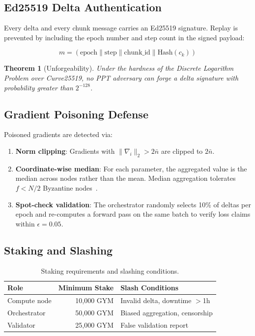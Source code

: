 \documentclass[11pt,letterpaper]{article}
\newtheorem{theorem}{Theorem}[section]
\begin{document}
\subsection{Ed25519 Delta Authentication}

Every delta and every chunk message carries an Ed25519 signature.  Replay is prevented by including the epoch number and step count in the signed payload:

\begin{equation}
    m = (\text{epoch} \| \text{step} \| \text{chunk\_id} \| \text{Hash}(c_k))
\end{equation}

\begin{theorem}[Unforgeability]
Under the hardness of the Discrete Logarithm Problem over Curve25519, no PPT adversary can forge a delta signature with probability greater than $2^{-128}$.
\end{theorem}

\subsection{Gradient Poisoning Defense}

Poisoned gradients are detected via:

\begin{enumerate}
    \item \textbf{Norm clipping}: Gradients with $\|\nabla_i\|_2 > 2\bar{n}$ are clipped to $2\bar{n}$.
    \item \textbf{Coordinate-wise median}: For each parameter, the aggregated value is the median across nodes rather than the mean.  Median aggregation tolerates $f < N/2$ Byzantine nodes~\cite{yin2018byzantine}.
    \item \textbf{Spot-check validation}: The orchestrator randomly selects 10\% of deltas per epoch and re-computes a forward pass on the same batch to verify loss claims within $\epsilon = 0.05$.
\end{enumerate}

\subsection{Staking and Slashing}

\begin{table}[t]
\centering
\begin{tabular}{lrl}
\toprule
\textbf{Role} & \textbf{Minimum Stake} & \textbf{Slash Conditions} \\
\midrule
Compute node & 10{,}000 GYM & Invalid delta, downtime $>$1h \\
Orchestrator & 50{,}000 GYM & Biased aggregation, censorship \\
Validator & 25{,}000 GYM & False validation report \\
\bottomrule
\end{tabular}
\caption{Staking requirements and slashing conditions.}
\label{tab:staking}
\end{table}
\end{document}
